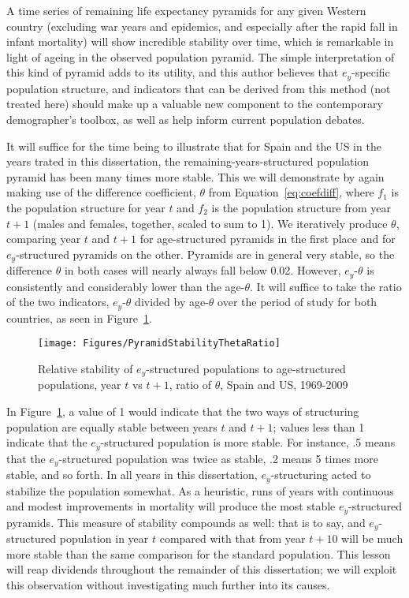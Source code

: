 A time series of remaining life expectancy pyramids for any given Western 
country (excluding war years and epidemics, and especially after the rapid fall
in infant mortality) will show incredible stability over time, which is
remarkable in light of ageing in the observed population pyramid. The simple 
interpretation of this kind of pyramid adds to its utility, and this author 
believes that $e_y$-specific population structure, and
indicators that can be derived from this method (not treated here) should 
make up a valuable new component to the contemporary demographer's toolbox, as well 
as help inform current population debates. 

It will suffice for the time being to
illustrate that for Spain and the US in the years trated in this dissertation,
the remaining-years-structured population pyramid has been many times more
stable. This we will demonstrate by again making use of the difference
coefficient, $\theta$ from Equation~\ref{eq:coefdiff}, where $f_1$ is the
population structure for year $t$ and $f_2$ is the population structure from
year $t+1$ (males and females, together, scaled to sum to 1). We iteratively
produce $\theta$, comparing year $t$ and $t+1$ for age-structured pyramids in
the first place and for $e_y$-structured pyramids on the other. Pyramids are in
general very stable, so the difference $\theta$ in both cases will nearly always
fall below 0.02. However, $e_y$-$\theta$ is consistently and considerably lower
than the age-$\theta$. It will suffice to take the ratio of the two indicators,
 $e_y$-$\theta$ divided by age-$\theta$ over the period of study for both
 countries, as seen in Figure~\ref{fig:PyramidStability}.

\begin{figure}
      \centering
      \caption{Relative stability of $e_y$-structured populations to
                age-structured populations, year $t$ vs $t+1$, ratio of
                $\theta$, Spain and US, 1969-2009} 
         \texttt{[image: Figures/PyramidStabilityThetaRatio]}
      \label{fig:PyramidStability} 
\end{figure}

In Figure~\ref{fig:PyramidStability}, a value of 1 would indicate that the two
ways of structuring population are equally stable between years $t$ and $t+1$;
values less than 1 indicate that the $e_y$-structured population is more stable.
For instance, .5 means that the $e_y$-structured population was twice as stable,
.2 means 5 times more stable, and so forth. In all years in this dissertation,
$e_y$-structuring acted to stabilize the population somewhat. As a heuristic,
runs of years with continuous and modest improvements in mortality will produce
the most stable $e_y$-structured pyramids. This measure of stability compounds
as well: that is to say, and $e_y$-structured population in year $t$
compared with that from year $t+10$ will be much more stable than the same
comparison for the standard population. This lesson will reap dividends
throughout the remainder of this dissertation; we will exploit this observation
without investigating much further into its causes.

\FloatBarrier